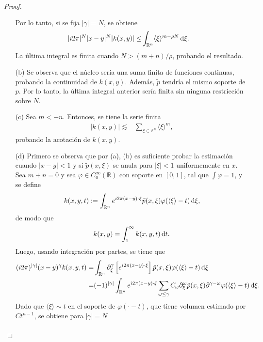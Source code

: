 \begin{proof}
\begin{itemize}
		Por lo tanto, si se fija $|\gamma| = N$, se obtiene
		\begin{align*}
			|i2\pi|^N|x-y|^N| k(x, y)| \leq & \int_{\mathbb{R}^n} \langle\xi\rangle^{m-\rho N} \mathop{}\!\mathrm{d} \xi.
		\end{align*}
		La última integral es finita cuando $N > (m + n)/\rho$, probando el resultado.\\
		\item[(b)] Se observa que el núcleo sería una suma finita de funciones continuas, probando la continuidad de $k(x, y)$. Además, $\tilde{p}$ tendría el mismo soporte de $p$. Por lo tanto, la última integral anterior sería finita sin ninguna restricción sobre $N$.\\
		\item[(c)] Sea $ m < -n$. Entonces, se tiene la serie finita
		\begin{align*}
			| k(x, y)| \lesssim &  \sum_{\xi \in \mathbb{Z}^n}\langle\xi\rangle^m,
		\end{align*}
		probando la acotación de $k(x, y)$.\\
		\item[(d)] Primero se observa que por (a), (b) es suficiente probar la estimación cuando $|x-y|<1$ y si $\tilde{p}(x, \xi)$ se anula para $|\xi|<1$ uniformemente en $x$. Sea $m + n = 0$ y sea $\varphi \in C_0^\infty(\mathbb{R})$ con soporte en $[0, 1]$, tal que $\int \varphi=1$, y se define 
		\begin{equation*}
			k(x, y, t) := \int_{\mathbb{R}^n} e^{i2\pi(x-y)\cdot \xi} \tilde{p}(x, \xi) \varphi(\langle\xi\rangle-t) \mathop{}\!\mathrm{d}\xi,
		\end{equation*}
		de modo que
		\begin{equation*}
			k(x, y) = \int_1^\infty k(x, y, t)\mathop{}\!\mathrm{d} t.
		\end{equation*}
		Luego, usando integración por partes, se tiene que
		\begin{align*}
			(i2\pi)^{|\gamma|}(x - y)^\gamma k(x, y, t) = & \int_{\mathbb{R}^n} \partial^\gamma_\xi\left[ e^{i2\pi(x-y)\cdot \xi} \right] \tilde{p}(x, \xi)\varphi(\langle\xi\rangle - t) \mathop{}\!\mathrm{d} \xi \\
			= & (-1)^{|\gamma|} \int_{\mathbb{R}^n} e^{i2\pi(x-y)\cdot \xi} \sum_{\omega \leq \gamma}C_\omega \partial^\omega_\xi \tilde{p}(x, \xi) \partial^{\gamma - \omega}\varphi(\langle\xi\rangle-t) \mathop{}\!\mathrm{d} \xi.
		\end{align*}
		Dado que $\langle\xi\rangle \sim t$ en el soporte de $\varphi(\cdot-t)$, que tiene volumen estimado por $Ct^{n-1}$, se obtiene para $|\gamma|=N$
		\begin{align*}

\end{align*}
\end{itemize}
\end{proof}
